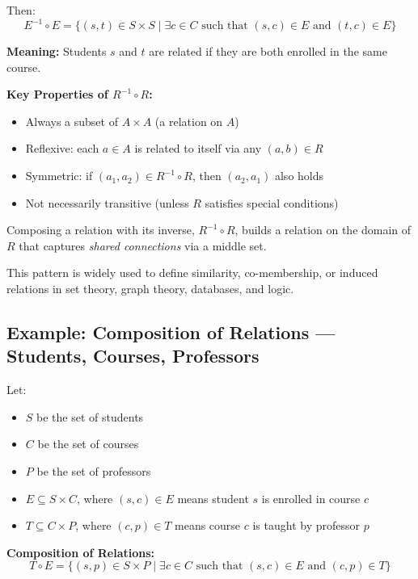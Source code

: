 \documentclass[10pt]{article}
\theoremstyle{plain}
\theoremstyle{definition}
\begin{document}
	Then:
	\[
	E^{-1} \circ E = \{ (s, t) \in S \times S \mid \exists c \in C \text{ such that } (s, c) \in E \text{ and } (t, c) \in E \}
	\]
	
	\textbf{Meaning:}  
	Students $s$ and $t$ are related if they are both enrolled in the same course.
	
	\vspace{1em}
	
	\textbf{Key Properties of $R^{-1} \circ R$:}
	\begin{itemize}
		\item Always a subset of $A \times A$ (a relation on $A$)
		\item Reflexive: each $a \in A$ is related to itself via any $(a, b) \in R$
		\item Symmetric: if $(a_1, a_2) \in R^{-1} \circ R$, then $(a_2, a_1)$ also holds
		\item Not necessarily transitive (unless $R$ satisfies special conditions)
	\end{itemize}
	
	\vspace{1em}
	
	
		Composing a relation with its inverse, $R^{-1} \circ R$, builds a relation on the domain of $R$ that captures \emph{shared connections} via a middle set.
		
		This pattern is widely used to define similarity, co-membership, or induced relations in set theory, graph theory, databases, and logic.
	
	
	\subsection*{Example: Composition of Relations — Students, Courses, Professors}
	
	Let:
	\begin{itemize}
		\item $S$ be the set of students
		\item $C$ be the set of courses
		\item $P$ be the set of professors
		\item $E \subseteq S \times C$, where $(s, c) \in E$ means student $s$ is enrolled in course $c$
		\item $T \subseteq C \times P$, where $(c, p) \in T$ means course $c$ is taught by professor $p$
	\end{itemize}
	
	\textbf{Composition of Relations:}
	\[
	T \circ E = \{ (s, p) \in S \times P \mid \exists c \in C \text{ such that } (s, c) \in E \text{ and } (c, p) \in T \}
	\]
	
\end{document}
